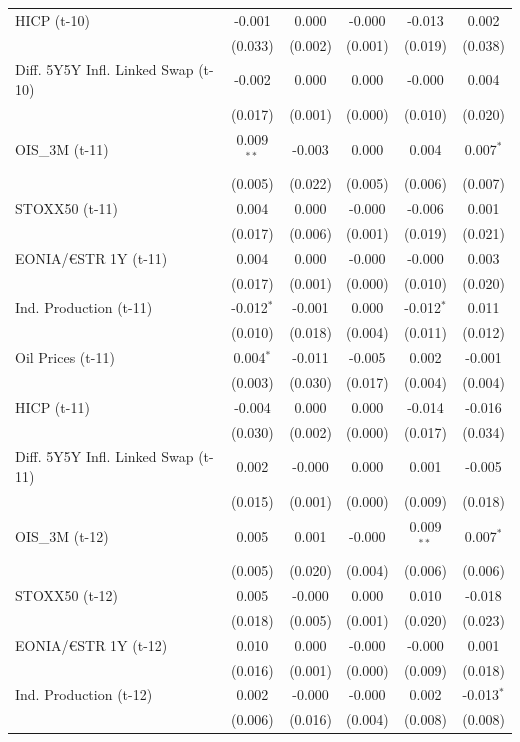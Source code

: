 \begin{longtable}[t]{lccccc}
HICP (t-10) & -0.001 & 0.000 & -0.000 & -0.013 & 0.002\\
 & (0.033) & (0.002) & (0.001) & (0.019) & (0.038)\\
Diff. 5Y5Y Infl. Linked Swap (t-10) & -0.002 & 0.000 & 0.000 & -0.000 & 0.004\\
 & (0.017) & (0.001) & (0.000) & (0.010) & \vphantom{1} (0.020)\\
OIS\_3M (t-11) & 0.009$^{**}$ & -0.003 & 0.000 & 0.004 & 0.007$^{*}$\\
 & (0.005) & (0.022) & (0.005) & (0.006) & (0.007)\\
STOXX50 (t-11) & 0.004 & 0.000 & -0.000 & -0.006 & 0.001\\
 & (0.017) & (0.006) & (0.001) & (0.019) & (0.021)\\
EONIA/€STR 1Y (t-11) & 0.004 & 0.000 & -0.000 & -0.000 & 0.003\\
 & (0.017) & (0.001) & (0.000) & (0.010) & (0.020)\\
Ind. Production (t-11) & -0.012$^{*}$ & -0.001 & 0.000 & -0.012$^{*}$ & 0.011\\
 & (0.010) & (0.018) & (0.004) & (0.011) & (0.012)\\
Oil Prices (t-11) & 0.004$^{*}$ & -0.011 & -0.005 & 0.002 & -0.001\\
 & (0.003) & (0.030) & (0.017) & (0.004) & (0.004)\\
HICP (t-11) & -0.004 & 0.000 & 0.000 & -0.014 & -0.016\\
 & (0.030) & (0.002) & (0.000) & (0.017) & (0.034)\\
Diff. 5Y5Y Infl. Linked Swap (t-11) & 0.002 & -0.000 & 0.000 & 0.001 & -0.005\\
 & (0.015) & (0.001) & (0.000) & (0.009) & (0.018)\\
OIS\_3M (t-12) & 0.005 & 0.001 & -0.000 & 0.009$^{**}$ & 0.007$^{*}$\\
 & (0.005) & (0.020) & (0.004) & (0.006) & (0.006)\\
STOXX50 (t-12) & 0.005 & -0.000 & 0.000 & 0.010 & -0.018\\
 & (0.018) & (0.005) & (0.001) & (0.020) & (0.023)\\
EONIA/€STR 1Y (t-12) & 0.010 & 0.000 & -0.000 & -0.000 & 0.001\\
 & (0.016) & (0.001) & (0.000) & (0.009) & (0.018)\\
Ind. Production (t-12) & 0.002 & -0.000 & -0.000 & 0.002 & -0.013$^{*}$\\
 & (0.006) & (0.016) & (0.004) & (0.008) & (0.008)\\

\end{longtable}
